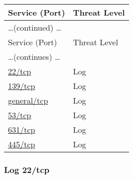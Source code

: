 \documentclass{article}
\begin{document}
\begin{longtable}{|l|l|}
\hline
\rowcolor{gvm_report}Service (Port)&Threat Level\\
\hline
\endfirsthead
\multicolumn{2}{l}{\hfill\ldots (continued) \ldots}\\
\hline
\rowcolor{gvm_report}Service (Port)&Threat Level\\
\hline
\endhead
\hline
\multicolumn{2}{l}{\ldots (continues) \ldots}\\
\endfoot
\hline
\endlastfoot
\hline
\hyperref[port:192.168.178.22 22/tcp Log]{22/tcp}&Log\\
\hline
\hyperref[port:192.168.178.22 139/tcp Log]{139/tcp}&Log\\
\hline
\hyperref[port:192.168.178.22 general/tcp Log]{general/tcp}&Log\\
\hline
\hyperref[port:192.168.178.22 53/tcp Log]{53/tcp}&Log\\
\hline
\hyperref[port:192.168.178.22 631/tcp Log]{631/tcp}&Log\\
\hline
\hyperref[port:192.168.178.22 445/tcp Log]{445/tcp}&Log\\
\hline
\end{longtable}



\subsubsection{Log 22/tcp}
\label{port:192.168.178.22 22/tcp Log}
\end{document}
